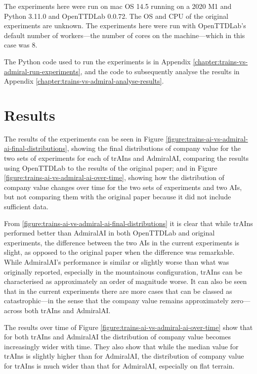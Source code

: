 \documentclass[logo,msc,dsti]{style/infthesis}    %
\begin{document}
{The experiments here were run on mac OS 14.5 running on a 2020 M1 and Python 3.11.0 and OpenTTDLab 0.0.72. The OS and CPU of the original experiments are unknown. The experiments here were run with OpenTTDLab's default number of workers---the number of cores on the machine---which in this case was 8.

The Python code used to run the experiments is in Appendix \ref{chapter:trains-vs-admiral-run-experiments}, and the code to subsequently analyse the results in Appendix \ref{chapter:trains-vs-admiral-analyse-results}.

\section{Results}

The results of the experiments can be seen in Figure \ref{figure:trains-ai-vs-admiral-ai-final-distributions}, showing the final distributions of company value for the two sets of experiments for each of trAIns and AdmiralAI, comparing the results using OpenTTDLab to the results of the original paper; and in Figure \ref{figure:trains-ai-vs-admiral-ai-over-time}, showing how the distribution of company value changes over time for the two sets of experiments and two AIs, but not comparing them with the original paper because it did not include sufficient data.

From \ref{figure:trains-ai-vs-admiral-ai-final-distributions} it is clear that while trAIns performed better than AdmiralAI in both OpenTTDLab and original experiments, the difference between the two AIs in the current experiments is slight, as opposed to the original paper when the difference was remarkable. While AdmiralAI's performance is similar or slightly worse than what was originally reported, especially in the mountainous configuration, trAIns can be characterised as approximately an order of magnitude worse. It can also be seen that in the current experiments there are more cases that can be classed as catastrophic---in the sense that the company value remains approximately zero---across both trAIns and AdmiralAI.

The results over time of Figure \ref{figure:trains-ai-vs-admiral-ai-over-time} show that for both trAIns and AdmiralAI the distribution of company value becomes increasingly wider with time. They also show that while the median value for trAIns is slightly higher than for AdmiralAI, the distribution of company value for trAIns is much wider than that for AdmiralAI, especially on flat terrain.

}
\end{document}
